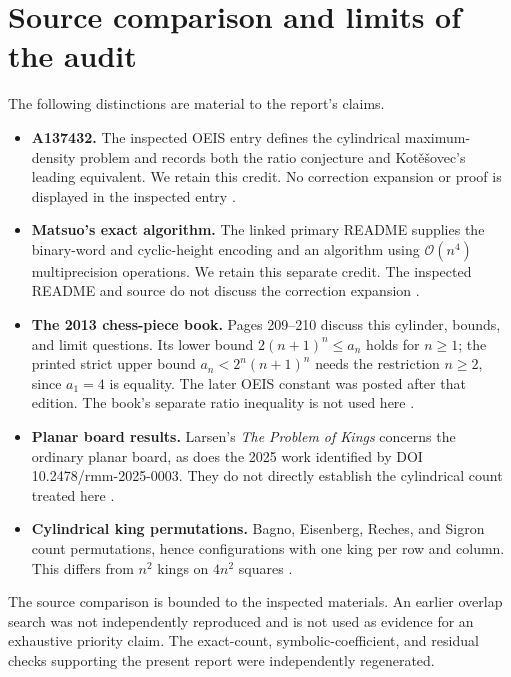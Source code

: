 \documentclass[11pt,letterpaper]{article}
\numberwithin{equation}{section}
\theoremstyle{remark}\newtheorem{remark}[theorem]{Remark}
\newcommand{\Oh}{\mathcal O}\newcommand{\Q}{\mathbb Q}\newcommand{\N}{\mathbb N}\newcommand{\R}{\mathbb R}
\begin{document}
\section{Source comparison and limits of the audit}\label{mdk:sq:sec:sources}
The following distinctions are material to the report's claims.
\begin{itemize}[leftmargin=*,itemsep=0.45em]
\item \textbf{A137432.} The inspected OEIS entry defines the cylindrical maximum-density problem and records both the ratio conjecture and Kot\v{e}\v{s}ovec's leading equivalent. We retain this credit. No correction expansion or proof is displayed in the inspected entry \cite{oeisA137432}.
\item \textbf{Matsuo's exact algorithm.} The linked primary README supplies the binary-word and cyclic-height encoding and an algorithm using $\Oh(n^4)$ multiprecision operations. We retain this separate credit. The inspected README and source do not discuss the correction expansion \cite{matsuo}.
\item \textbf{The 2013 chess-piece book.} Pages 209--210 discuss this cylinder, bounds, and limit questions. Its lower bound $2(n+1)^n\le a_n$ holds for $n\ge1$; the printed strict upper bound $a_n<2^n(n+1)^n$ needs the restriction $n\ge2$, since $a_1=4$ is equality. The later OEIS constant was posted after that edition. The book's separate ratio inequality is not used here \cite{kotesovec}.
\item \textbf{Planar board results.} Larsen's \emph{The Problem of Kings} concerns the ordinary planar board, as does the 2025 work identified by DOI 10.2478/rmm-2025-0003. They do not directly establish the cylindrical count treated here \cite{larsen,brown}.
\item \textbf{Cylindrical king permutations.} Bagno, Eisenberg, Reches, and Sigron count permutations, hence configurations with one king per row and column. This differs from $n^2$ kings on $4n^2$ squares \cite{bagno}.
\end{itemize}
The source comparison is bounded to the inspected materials. An earlier overlap search was not independently reproduced and is not used as evidence for an exhaustive priority claim. The exact-count, symbolic-coefficient, and residual checks supporting the present report were independently regenerated.
\end{document}
